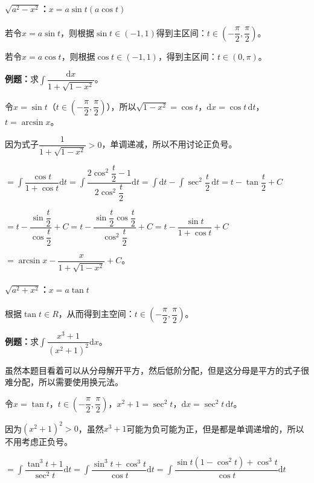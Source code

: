 \documentclass[UTF8, 12pt]{ctexart}
\begin{document}
\paragraph{\texorpdfstring{$\sqrt{a^2-x^2}$：$x=a\sin t(a\cos t)$}\ } \leavevmode \medskip

若令$x=a\sin t$，则根据$\sin t\in(-1,1)$得到主区间：$t\in\left(-\dfrac{\pi}{2},\dfrac{\pi}{2}\right)$。

若令$x=a\cos t$，则根据$\cos t\in(-1,1)$，得到主区间：$t\in(0,\pi)$。

\textbf{例题：}求$\displaystyle{\int\dfrac{\textrm{d}x}{1+\sqrt{1-x^2}}}$。\medskip

令$x=\sin t$（$t\in\left(-\dfrac{\pi}{2},\dfrac{\pi}{2}\right)$），所以$\sqrt{1-x^2}=\cos t$，$\textrm{d}x=\cos t\,\textrm{d}t$，$t=\arcsin x$。

因为式子$\dfrac{1}{1+\sqrt{1-x^2}}>0$，单调递减，所以不用讨论正负号。

$=\displaystyle{\int\dfrac{\cos t}{1+\cos t}\textrm{d}t=\int\dfrac{2\cos^2\dfrac{t}{2}-1}{2\cos^2\dfrac{t}{2}}\textrm{d}t=\int\textrm{d}t-\int\sec^2\dfrac{t}{2}\,\textrm{d}t=t-\tan}\dfrac{t}{2}+C$

$=t-\dfrac{\sin\dfrac{t}{2}}{\cos\dfrac{t}{2}}+C=t-\dfrac{\sin\dfrac{t}{2}\cos\dfrac{t}{2}}{\cos^2\dfrac{t}{2}}+C=t-\dfrac{\sin t}{1+\cos t}+C$

$=\arcsin x-\dfrac{x}{1+\sqrt{1-x^2}}+C$。

\paragraph{\texorpdfstring{$\sqrt{a^2+x^2}$：$x=a\tan t$}\ } \leavevmode \medskip

根据$\tan t\in R$，从而得到主空间：$t\in\left(-\dfrac{\pi}{2},\dfrac{\pi}{2}\right)$。

\textbf{例题：}求$\displaystyle{\int\dfrac{x^3+1}{(x^2+1)^2}\textrm{d}x}$。\medskip

虽然本题目看着可以从分母解开平方，然后低阶分配，但是这分母是平方的式子很难分配，所以需要使用换元法。

令$x=\tan t$，$t\in\left(-\dfrac{\pi}{2},\dfrac{\pi}{2}\right)$，$x^2+1=\sec^2t$，$\textrm{d}x=\sec^2t\,\textrm{d}t$。

因为$(x^2+1)^2>0$，虽然$x^3+1$可能为负可能为正，但是都是单调递增的，所以不用考虑正负号。

$=\displaystyle{\int\dfrac{\tan^3t+1}{\sec^2t}\textrm{d}t=\int\dfrac{\sin^3t+\cos^3t}{\cos t}\textrm{d}t=\int\dfrac{\sin t(1-\cos^2t)+\cos^3t}{\cos t}\textrm{d}t}$
\end{document}
